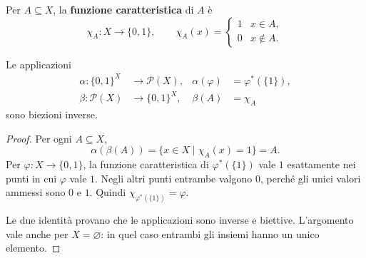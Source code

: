 \begin{definizione}
Per $A\subseteq X$, la \textbf{funzione caratteristica} di $A$ è
\[
\chi_A:X\to\{0,1\},\qquad
\chi_A(x)=\begin{cases}1&x\in A,\\0&x\notin A.\end{cases}
\]
\end{definizione}

\begin{teorema}\label{teo:caratteristiche}
Le applicazioni
\[
\begin{aligned}
\alpha:\{0,1\}^X&\to\mathcal P(X),&\alpha(\varphi)&=\varphi^*(\{1\}),\\
\beta:\mathcal P(X)&\to\{0,1\}^X,&\beta(A)&=\chi_A
\end{aligned}
\]
sono biezioni inverse.
\end{teorema}
\begin{proof}
 Per ogni $A\subseteq X$,
\[
\alpha(\beta(A))=\{x\in X\mid\chi_A(x)=1\}=A.
\]
 Per $\varphi:X\to\{0,1\}$, la funzione caratteristica di $\varphi^*(\{1\})$ vale $1$ esattamente nei punti in cui $\varphi$ vale $1$. Negli altri punti entrambe valgono $0$, perché gli unici valori ammessi sono $0$ e $1$. Quindi $\chi_{\varphi^*(\{1\})}=\varphi$.

Le due identità provano che le applicazioni sono inverse e biettive. L'argomento vale anche per $X=\varnothing$: in quel caso entrambi gli insiemi hanno un unico elemento.
\end{proof}
